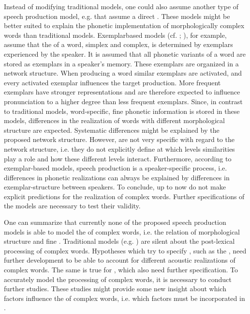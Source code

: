  
 Instead of modifying traditional models, one could also assume another type of speech production model, e.g.  that assume a direct . These models might be better suited to explain the phonetic implementation of morphologically complex words than traditional models. Exemplarbased models (cf. \citealt{Johnson.1997b,Pierrehumbert.2001,Pierrehumbert.2002}; \citealt{Bybee.2002}), for example, assume that the  of a word, simplex and complex, is determined by exemplars experienced by the speaker. It is assumed that all phonetic variants of a word are stored as exemplars in a speaker's memory. These exemplars are organized in a network structure. When producing a word similar exemplars are activated, and every activated exemplar influences the target production. More frequent exemplars have stronger representations and are therefore expected to influence pronunciation to a higher degree than less frequent exemplars. 
 Since, in contrast to traditional models, word-specific, fine phonetic  information is stored in these models, differences in the realization of words with different morphological structure are expected. Systematic differences might be explained by the proposed network structure.
 However,  are not very specific with regard to the network structure, i.e. they do not explicitly define at which levels similarities play a role and how these different levels interact. Furthermore, according to exemplar-based models, speech production is a speaker-specific process, i.e. differences in phonetic realizations can always be explained by differences in exemplar-structure between speakers. To conclude, up to now  do not make explicit predictions for the realization of complex words. Further specifications of the models are necessary to test their validity.
 

One can summarize that currently none of the proposed speech production models is able to model the  of complex words, i.e. the relation of morphological structure and fine .  Traditional models (e.g. \citealt{Dell.1986,Levelt.1999b}) are silent about the post-lexical processing of complex words. Hypotheses which try to specify , such as the , need further development to be able to account for different acoustic realizations of complex words. The same is true for , which also need further specification. To accurately model the processing of complex words, it is necessary to conduct further studies. 
These studies might provide some new insight about which factors influence the 
 of complex words, i.e. which factors must be incorporated in .
 

